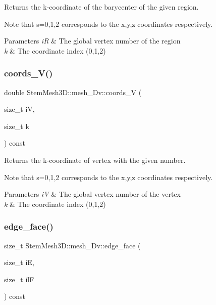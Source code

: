 Returns the k-\/coordinate of the barycenter of the given region. 

Note that s=0,1,2 corresponds to the x,y,z coordinates respectively. 
\begin{DoxyParams}{Parameters}
{\em iR} & The global vertex number of the region \\
\hline
{\em k} & The coordinate index (0,1,2) \\
\hline
\end{DoxyParams}
\mbox{\label{classStemMesh3D_1_1mesh__3Dv_a29503e2b5f21281a0fd14ec774c1c5da}} 
\subsubsection{\texorpdfstring{coords\+\_\+\+V()}{coords\_V()}}
{\footnotesize\ttfamily double Stem\+Mesh3\+D\+::mesh\+\_\+Dv\+::coords\+\_\+V (\begin{DoxyParamCaption}\item[{size\+\_\+t}]{iV,  }\item[{size\+\_\+t}]{k }\end{DoxyParamCaption}) const}



Returns the k-\/coordinate of vertex with the given number. 

Note that s=0,1,2 corresponds to the x,y,z coordinates respectively. 
\begin{DoxyParams}{Parameters}
{\em iV} & The global vertex number of the vertex \\
\hline
{\em k} & The coordinate index (0,1,2) \\
\hline
\end{DoxyParams}
\mbox{\label{classStemMesh3D_1_1mesh__3Dv_aef749900ff2a72c8dbb21b28f3c21556}} 
\subsubsection{\texorpdfstring{edge\+\_\+face()}{edge\_face()}}
{\footnotesize\ttfamily size\+\_\+t Stem\+Mesh3\+D\+::mesh\+\_\+Dv\+::edge\+\_\+face (\begin{DoxyParamCaption}\item[{size\+\_\+t}]{iE,  }\item[{size\+\_\+t}]{ilF }\end{DoxyParamCaption}) const}



